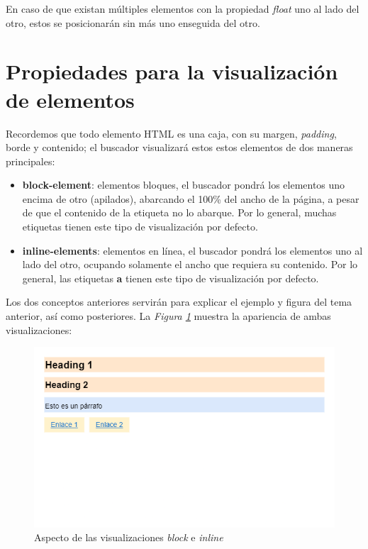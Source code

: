 En caso de que existan múltiples elementos con la propiedad \textit{float} uno al lado del otro, estos se posicionarán sin más uno enseguida del otro.



\section{Propiedades para la visualización de elementos}

Recordemos que todo elemento HTML es una caja, con su margen, \textit{padding}, borde y contenido; el buscador visualizará estos estos elementos de dos maneras principales:
\begin{itemize}
    \item \textbf{block-element}: elementos bloques, el buscador pondrá los elementos uno encima de otro (apilados), abarcando el 100\% del ancho de la página, a pesar de que el contenido de la etiqueta no lo abarque. Por lo general, muchas etiquetas tienen este tipo de visualización por defecto.
    \item \textbf{inline-elements}: elementos en línea, el buscador pondrá los elementos uno al lado del otro, ocupando solamente el ancho que requiera su contenido. Por lo general, las etiquetas \textbf{a} tienen este tipo de visualización por defecto.
\end{itemize}

Los dos conceptos anteriores servirán para explicar el ejemplo y figura del tema anterior, así como posteriores. La \textit{Figura \ref{fig: 27}} muestra la apariencia de ambas visualizaciones:
\begin{figure}[H]
    \centering
    \caption{Aspecto de las visualizaciones \textit{block} e \textit{inline}}
    \label{fig: 27}
    \includegraphics[width=12cm]{ss/display.png}
\end{figure}

